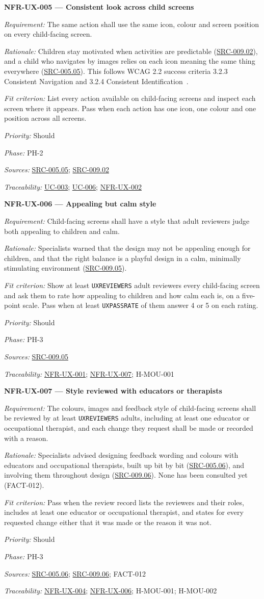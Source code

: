 \documentclass[12pt]{article}
\renewcommand{\_}{\textunderscore\allowbreak}%
\newcommand{\ucref}[1]{\hyperref[uc:#1]{\mbox{UC-#1}}}
\newenvironment{srsrequirement}[2]{%
  \par\medskip\noindent\phantomsection\label{req:#1}%
  \textbf{#1 --- #2}\par\nobreak\smallskip }{\par\medskip}
\newcommand{\reqfield}[2]{\noindent\textit{#1:} #2\par}
\newcommand{\reqshall}[1]{\reqfield{Requirement}{#1}}
\newcommand{\reqrationale}[1]{\reqfield{Rationale}{#1}}
\newcommand{\reqfit}[1]{\reqfield{Fit criterion}{#1}}
\newcommand{\reqpriority}[1]{\reqfield{Priority}{#1}}
\newcommand{\reqphase}[1]{\reqfield{Phase}{#1}}
\newcommand{\reqsources}[1]{\reqfield{Sources}{#1}}
\newcommand{\reqtraces}[1]{\reqfield{Traceability}{#1}}
\newcommand{\reqref}[1]{\hyperref[req:#1]{#1}}
\newcommand{\srcref}[1]{\hyperref[src:#1]{SRC-#1}}
\providecommand{\ucref}[1]{\hyperref[uc:#1]{UC-#1}}
\begin{document}
\begin{srsrequirement}{NFR-UX-005}{Consistent look across child screens}
  \reqshall{The same action shall use the same icon, colour and screen position
on every child-facing screen.} \reqrationale{Children stay motivated when
activities are predictable (\srcref{009.02}), and a child who navigates by
images relies on each icon meaning the same thing everywhere (\srcref{005.05}).
This follows WCAG 2.2 success criteria 3.2.3 Consistent Navigation and 3.2.4
Consistent Identification~\cite{wcag22}.} \reqfit{List every action available on
child-facing screens and inspect each screen where it appears. Pass when each
action has one icon, one colour and one position across all screens.}
  \reqpriority{Should}
  \reqphase{PH-2}
  \reqsources{\srcref{005.05}; \srcref{009.02}} \reqtraces{\ucref{003};
  \ucref{006}; \reqref{NFR-UX-002}}
\end{srsrequirement}

\begin{srsrequirement}{NFR-UX-006}{Appealing but calm style}
  \reqshall{Child-facing screens shall have a style that adult reviewers judge
both appealing to children and calm.} \reqrationale{Specialists warned that the
design may not be appealing enough for children, and that the right balance is a
playful design in a calm, minimally stimulating environment (\srcref{009.05}).}
\reqfit{Show at least \texttt{UX\_REVIEWERS} adult reviewers every child-facing
screen and ask them to rate how appealing to children and how calm each is, on a
five-point scale. Pass when at least \texttt{UX\_PASS\_RATE} of them answer 4 or
5 on each rating.}
  \reqpriority{Should}
  \reqphase{PH-3}
  \reqsources{\srcref{009.05}} \reqtraces{\reqref{NFR-UX-001};
  \reqref{NFR-UX-007}; H-MOU-001}
\end{srsrequirement}

\begin{srsrequirement}{NFR-UX-007}{Style reviewed with educators or therapists}
\reqshall{The colours, images and feedback style of child-facing screens shall
be reviewed by at least \texttt{UX\_REVIEWERS} adults, including at least one
educator or occupational therapist, and each change they request shall be made
or recorded with a reason.} \reqrationale{Specialists advised designing feedback
wording and colours with educators and occupational therapists, built up bit by
bit (\srcref{005.06}), and involving them throughout design (\srcref{009.06}).
None has been consulted yet (FACT-012).} \reqfit{Pass when the review record
lists the reviewers and their roles, includes at least one educator or
occupational therapist, and states for every requested change either that it was
made or the reason it was not.}
  \reqpriority{Should}
  \reqphase{PH-3}
  \reqsources{\srcref{005.06}; \srcref{009.06}; FACT-012}
  \reqtraces{\reqref{NFR-UX-004}; \reqref{NFR-UX-006}; H-MOU-001; H-MOU-002}
\end{srsrequirement}
\endgroup
\end{document}
